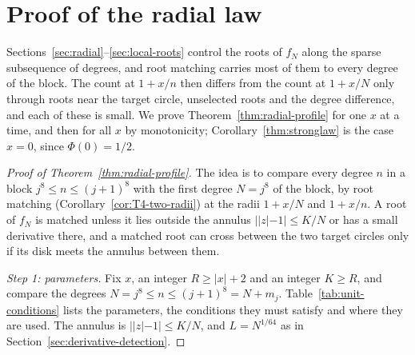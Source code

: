 \section{Proof of the radial law}\label{sec:layer3}\label{sec:unit-circle}\label{sec:moving-radii}
Sections~\ref{sec:radial}--\ref{sec:local-roots} control the roots of
$f_N$ along the sparse subsequence of degrees, and root matching carries
most of them to every degree of the block. The count at $1+x/n$ then
differs from the count at $1+x/N$ only through roots near the target
circle, unselected roots and the degree difference, and each of these is
small. We prove Theorem~\ref{thm:radial-profile} for one $x$ at a time,
and then for all $x$ by monotonicity; Corollary~\ref{thm:stronglaw} is
the case $x=0$, since $\Phi(0)=1/2$.

\begin{proof}[Proof of Theorem~\ref{thm:radial-profile}]
The idea is to compare every degree $n$ in a block
$j^8\le n\le(j+1)^8$ with the first degree $N=j^8$ of the block, by root
matching (Corollary~\ref{cor:T4-two-radii}) at the radii $1+x/N$ and
$1+x/n$. A root of $f_N$ is matched unless it lies outside the annulus
$||z|-1|\le K/N$ or has a small derivative there, and a matched root can
cross between the two target circles only if its disk meets the annulus
between them.

\emph{Step 1: parameters.}
Fix $x$, an integer $R\ge|x|+2$ and an integer $K\ge R$, and compare the
degrees $N=j^8\le n\le(j+1)^8=N+m_j$. Table~\ref{tab:unit-conditions}
lists the parameters, the conditions they must satisfy and where they
are used. The annulus is $||z|-1|\le K/N$, and $L=N^{1/64}$ as in
Section~\ref{sec:derivative-detection}.


\end{proof}
